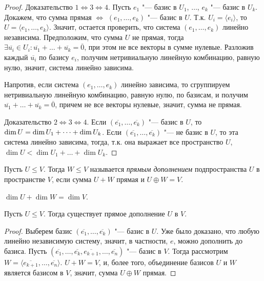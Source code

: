 \begin{proof}
	Доказательство $1 \Leftrightarrow 3 \Leftrightarrow 4$. Пусть $e_1$ "--- базис в $U_1$, $\dots$, $e_k$ "--- базис в $U_k$. Докажем, что сумма прямая $\Leftrightarrow$ $(e_1, \dots, e_k)$ "--- базис в $U$. Т.\:к. $U_i = \langle e_i\rangle$, то $U = \langle e_1, \dots, e_k \rangle$. Значит, остается проверить, что система $(e_1, \dots, e_k)$ линейно независима. Предположим, что сумма $U$ не прямая, тогда $\exists \overline{u_i} \in U_i: \overline{u_1} + \dots + \overline{u_k} = \overline{0}$, при этом не все векторы в сумме нулевые. Разложив каждый $\overline{u_i}$ по базису $e_i$, получим нетривиальную линейную комбинацию, равную нулю, значит, система линейно зависима.
	
	Напротив, если система $(e_1, \dots, e_k)$ линейно зависима, то сгруппируем нетривиальную линейную комбинацию, равную нулю, по базисам, и получим $\overline{u_1} + \dots + \overline{u_k} = \overline{0}$, причем не все векторы нулевые, значит, сумма не прямая.
	
	Доказательство $2 \Leftrightarrow 3 \Leftrightarrow 4$. Если $(\overline{e_1}, \dots, \overline{e_k})$ "--- базис в $U$, то $\dim{U} \hm{=} \dim{U_1} + \dots + \dim{U_k}$. Если $(\overline{e_1}, \dots, \overline{e_k})$ "--- не базис в $U$, то эта система линейно зависима, тогда, т.\:к. она выражает все пространство $U$, $\dim{U} < \dim{U_1} + \dots + \dim{U_k}$.
\end{proof}

\begin{definition}
	Пусть $U \le V$. Тогда $W \le V$ называется \textit{прямым дополнением} подпространства $U$ в пространстве $V$, если сумма $U + W$ прямая и $U \oplus W = V$.
\end{definition}

\begin{note}
	$\dim{U} + \dim{W} = \dim{V}$.
\end{note}

\begin{proposition}
	Пусть $U \le V$. Тогда существует прямое дополнение $U$ в $V$.
\end{proposition}

\begin{proof}
	Выберем базис $(\overline{e_1}, \dots, \overline{e_k})$ "--- базис в $U$. Уже было доказано, что любую линейно независимую систему, значит, в частности, $e$, можно дополнить до базиса. Пусть $(\overline{e_1}, \dots, \overline{e_k}, \overline{e_{k+1}}, \dots, \overline{e_n})$ "--- базис в $V$. Тогда рассмотрим $W = \langle \overline{e_{k+1}}, \dots, \overline{e_n}\rangle$. $U + W = V$, и, более того, объединение базисов $U$ и $W$ является базисом в $V$, значит, сумма $U \oplus W$ прямая.
\end{proof}

